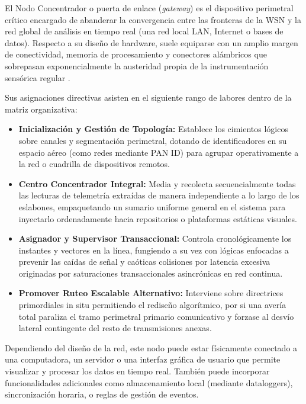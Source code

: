El Nodo Concentrador o puerta de enlace (\textit{gateway}) es el dispositivo perimetral crítico encargado de abanderar la convergencia entre las fronteras de la WSN y la red global de análisis en tiempo real (una red local LAN, Internet o bases de datos). Respecto a su diseño de hardware, suele equiparse con un amplio margen de conectividad, memoria de procesamiento y conectores alámbricos que sobrepasan exponencialmente la austeridad propia de la instrumentación sensórica regular \cite{perez2014metodologia}.

Sus asignaciones directivas asisten en el siguiente rango de labores dentro de la matriz organizativa:

\begin{itemize}
    \item \textbf{Inicialización y Gestión de Topología:} Establece los cimientos lógicos sobre canales y segmentación perimetral, dotando de identificadores en su espacio aéreo (como redes mediante PAN ID) para agrupar operativamente a la red o cuadrilla de dispositivos remotos.
    \item \textbf{Centro Concentrador Integral:} Media y recolecta secuencialmente todas las lecturas de telemetría extraídas de manera independiente a lo largo de los eslabones, empaquetando un sumario uniforme general en el sistema para inyectarlo ordenadamente hacia repositorios o plataformas estáticas visuales.
    \item \textbf{Asignador y Supervisor Transaccional:} Controla cronológicamente los instantes y vectores en la línea, fungiendo a su vez con lógicas enfocadas a prevenir las caídas de señal y caóticas colisiones por latencia excesiva originadas por saturaciones transaccionales asincrónicas en red continua. 
    \item \textbf{Promover Ruteo Escalable Alternativo:} Interviene sobre directrices primordiales in situ permitiendo el rediseño algorítmico, por si una avería total paraliza el tramo perimetral primario comunicativo y forzase al desvío lateral contingente del resto de transmisiones anexas.
\end{itemize}

Dependiendo del diseño de la red, este nodo puede estar físicamente conectado a una computadora, un servidor o una interfaz gráfica de usuario que permite visualizar y procesar los datos en tiempo real. También puede incorporar funcionalidades adicionales como almacenamiento local (mediante dataloggers), sincronización horaria, o reglas de gestión de eventos.

